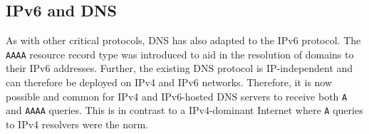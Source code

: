 % 
\subsection{IPv6 and DNS} \label{sec:background:ipv6}

As with other critical protocols, DNS has also adapted to the IPv6 protocol.
The {\tt AAAA} resource record type was introduced to aid in the resolution of
domains to their IPv6 addresses. Further, the existing DNS protocol is
IP-independent and can therefore be deployed on IPv4 and IPv6 networks.
Therefore, it is now possible and common for IPv4 and IPv6-hosted DNS servers
to receive both {\tt A} and {\tt AAAA} queries. This is in contrast to
a IPv4-dominant Internet where {\tt A} queries to IPv4 resolvers were the norm.

